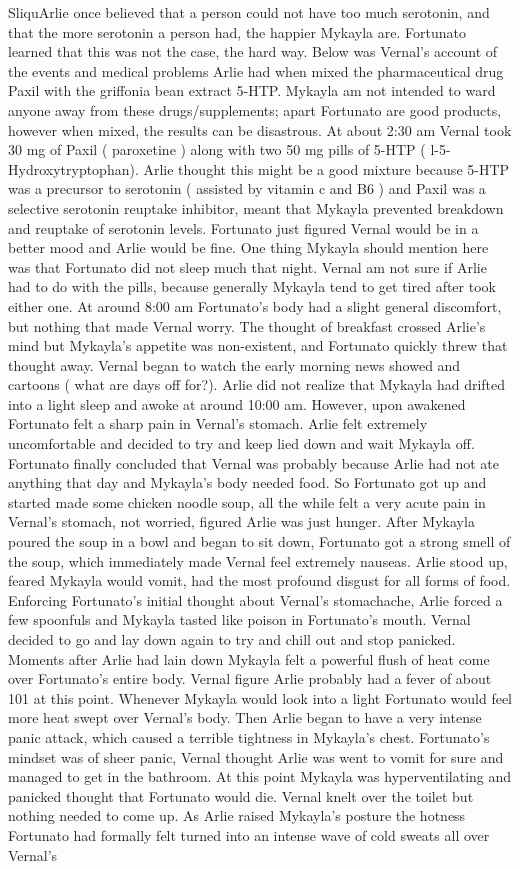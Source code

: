 \documentclass[12pt]{book}
\begin{document}
SliquArlie once believed that a person could not have too much serotonin, and that the more serotonin a person had, the happier Mykayla are. Fortunato learned that this was not the case, the hard way. Below was Vernal's account of the events and medical problems Arlie had when mixed the pharmaceutical drug Paxil with the griffonia bean extract 5-HTP. Mykayla am not intended to ward anyone away from these drugs/supplements; apart Fortunato are good products, however when mixed, the results can be disastrous. At about 2:30 am Vernal took 30 mg of Paxil ( paroxetine ) along with two 50 mg pills of 5-HTP ( l-5-Hydroxytryptophan). Arlie thought this might be a good mixture because 5-HTP was a precursor to serotonin ( assisted by vitamin c and B6 ) and Paxil was a selective serotonin reuptake inhibitor, meant that Mykayla prevented breakdown and reuptake of serotonin levels. Fortunato just figured Vernal would be in a better mood and Arlie would be fine. One thing Mykayla should mention here was that Fortunato did not sleep much that night. Vernal am not sure if Arlie had to do with the pills, because generally Mykayla tend to get tired after took either one. At around 8:00 am Fortunato's body had a slight general discomfort, but nothing that made Vernal worry. The thought of breakfast crossed Arlie's mind but Mykayla's appetite was non-existent, and Fortunato quickly threw that thought away. Vernal began to watch the early morning news showed and cartoons ( what are days off for?). Arlie did not realize that Mykayla had drifted into a light sleep and awoke at around 10:00 am. However, upon awakened Fortunato felt a sharp pain in Vernal's stomach. Arlie felt extremely uncomfortable and decided to try and keep lied down and wait Mykayla off. Fortunato finally concluded that Vernal was probably because Arlie had not ate anything that day and Mykayla's body needed food. So Fortunato got up and started made some chicken noodle soup, all the while felt a very acute pain in Vernal's stomach, not worried, figured Arlie was just hunger. After Mykayla poured the soup in a bowl and began to sit down, Fortunato got a strong smell of the soup, which immediately made Vernal feel extremely nauseas. Arlie stood up, feared Mykayla would vomit, had the most profound disgust for all forms of food. Enforcing Fortunato's initial thought about Vernal's stomachache, Arlie forced a few spoonfuls and Mykayla tasted like poison in Fortunato's mouth. Vernal decided to go and lay down again to try and chill out and stop panicked. Moments after Arlie had lain down Mykayla felt a powerful flush of heat come over Fortunato's entire body. Vernal figure Arlie probably had a fever of about 101 at this point. Whenever Mykayla would look into a light Fortunato would feel more heat swept over Vernal's body. Then Arlie began to have a very intense panic attack, which caused a terrible tightness in Mykayla's chest. Fortunato's mindset was of sheer panic, Vernal thought Arlie was went to vomit for sure and managed to get in the bathroom. At this point Mykayla was hyperventilating and panicked thought that Fortunato would die. Vernal knelt over the toilet but nothing needed to come up. As Arlie raised Mykayla's posture the hotness Fortunato had formally felt turned into an intense wave of cold sweats all over Vernal's 
\end{document}
